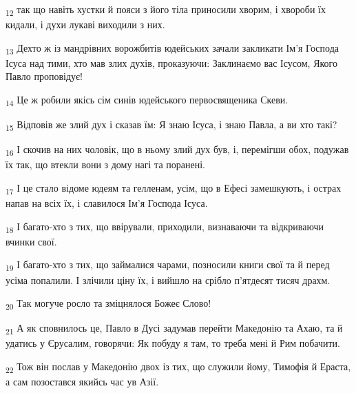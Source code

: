 \begin{tcolorbox}
\textsubscript{12} так що навіть хустки й пояси з його тіла приносили хворим, і хвороби їх кидали, і духи лукаві виходили з них.
\end{tcolorbox}
\begin{tcolorbox}
\textsubscript{13} Дехто ж із мандрівних ворожбитів юдейських зачали закликати Ім'я Господа Ісуса над тими, хто мав злих духів, проказуючи: Заклинаємо вас Ісусом, Якого Павло проповідує!
\end{tcolorbox}
\begin{tcolorbox}
\textsubscript{14} Це ж робили якісь сім синів юдейського первосвященика Скеви.
\end{tcolorbox}
\begin{tcolorbox}
\textsubscript{15} Відповів же злий дух і сказав їм: Я знаю Ісуса, і знаю Павла, а ви хто такі?
\end{tcolorbox}
\begin{tcolorbox}
\textsubscript{16} І скочив на них чоловік, що в ньому злий дух був, і, перемігши обох, подужав їх так, що втекли вони з дому нагі та поранені.
\end{tcolorbox}
\begin{tcolorbox}
\textsubscript{17} І це стало відоме юдеям та гелленам, усім, що в Ефесі замешкують, і острах напав на всіх їх, і славилося Ім'я Господа Ісуса.
\end{tcolorbox}
\begin{tcolorbox}
\textsubscript{18} І багато-хто з тих, що ввірували, приходили, визнаваючи та відкриваючи вчинки свої.
\end{tcolorbox}
\begin{tcolorbox}
\textsubscript{19} І багато-хто з тих, що займалися чарами, позносили книги свої та й перед усіма попалили. І злічили ціну їх, і вийшло на срібло п'ятдесят тисяч драхм.
\end{tcolorbox}
\begin{tcolorbox}
\textsubscript{20} Так могуче росло та зміцнялося Божеє Слово!
\end{tcolorbox}
\begin{tcolorbox}
\textsubscript{21} А як сповнилось це, Павло в Дусі задумав перейти Македонію та Ахаю, та й удатись у Єрусалим, говорячи: Як побуду я там, то треба мені й Рим побачити.
\end{tcolorbox}
\begin{tcolorbox}
\textsubscript{22} Тож він послав у Македонію двох із тих, що служили йому, Тимофія й Ераста, а сам позостався якийсь час ув Азії.
\end{tcolorbox}
